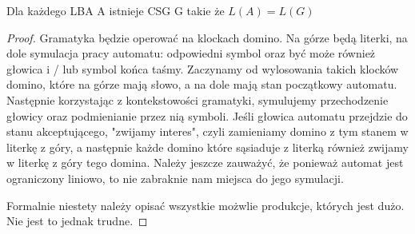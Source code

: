 \begin{theorem}
	Dla każdego LBA A istnieje CSG G takie że \( L(A) = L(G) \)
\end{theorem}

\begin{proof}
	Gramatyka będzie operować na klockach domino. Na górze będą literki, na dole symulacja pracy automatu: odpowiedni symbol oraz być może również głowica i / lub symbol końca taśmy. Zaczynamy od wylosowania takich klocków domino, które na górze mają słowo, a na dole mają stan początkowy automatu.
	Następnie korzystając z kontekstowości gramatyki, symulujemy przechodzenie głowicy oraz podmienianie przez nią symboli. Jeśli głowica automatu przejdzie do stanu akceptującego, "zwijamy interes", czyli zamieniamy domino z tym stanem w literkę z góry, a następnie każde domino które sąsiaduje
	z literką również zwijamy w literkę z góry tego domina. Należy jeszcze zauważyć, że ponieważ automat jest ograniczony liniowo, to nie zabraknie nam miejsca do jego symulacji.

	Formalnie niestety należy opisać wszystkie możwlie produkcje, których jest dużo. Nie jest to jednak trudne.
\end{proof}